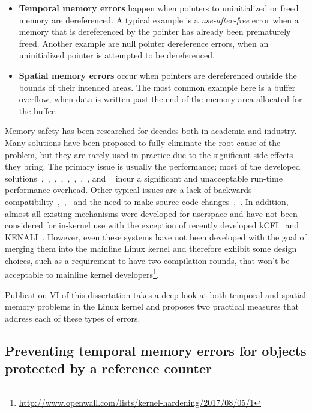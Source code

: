 \begin{itemize}
	\item \textbf{Temporal memory errors} happen when pointers to uninitialized or freed memory are dereferenced. A typical example is a \emph{use-after-free} error when a memory that is dereferenced by the pointer has already been prematurely freed. Another example are null pointer dereference errors, when an uninitialized pointer is attempted to be dereferenced. 
	\item \textbf{Spatial memory errors} occur when pointers are dereferenced outside the bounds of their intended areas. The most common example here is a buffer overflow, when data is written past the end of the memory area allocated for the buffer. 
\end{itemize}

Memory safety has been researched for decades both in academia and industry.
Many solutions have been proposed to fully eliminate the root cause of the problem, but they are rarely used in practice due to the significant side effects they bring. 
The primary issue is usually the performance; most of the developed solutions~\cite{hastings1991purify},~\cite{patil1995efficient},~\cite{patil1997low},~\cite{nagarakatte2009softbound},~\cite{jones1997backwards},~\cite{yong2003protecting},~\cite{xu2004efficient},~\cite{nethercote2004bounds}, and ~\cite{dhurjati2006backwards} incur a significant and unacceptable run-time performance overhead.
Other typical issues are a lack of backwards compatibility~\cite{necula2002ccured},~\cite{grossman2005cyclone},~\cite{austin1994efficient} and the need to make source code changes~\cite{necula2002ccured},~\cite{grossman2005cyclone}. 
In addition, almost all existing mechanisms were developed for userspace and have not been considered for in-kernel use with the exception of recently developed kCFI~\cite{Rigo} and KENALI~\cite{kenali}. However, even these systems have not been developed with the goal of merging them into the mainline Linux kernel and therefore exhibit some design choices, such as a requirement to have two compilation rounds, that won't be acceptable to mainline kernel developers\footnote{\url{http://www.openwall.com/lists/kernel-hardening/2017/08/05/1}}. 

Publication VI of this dissertation takes a deep look at both temporal and spatial memory problems in the Linux kernel and proposes two practical measures that address each of these types of errors. 

\subsection{Preventing temporal memory errors for objects protected by a reference counter}
\label{sec:kern-mem-ref-count}

